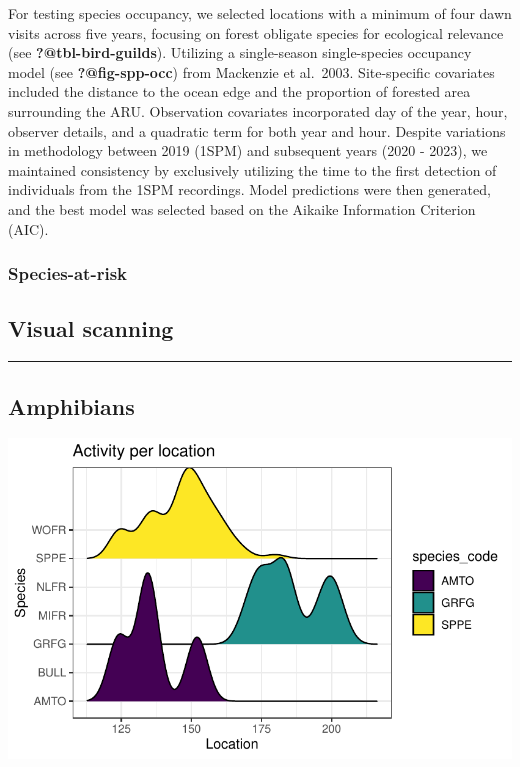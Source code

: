 \documentclass[
  letterpaper,
  DIV=11,
  numbers=noendperiod,
  oneside]{scrartcl}
\begin{document}
For testing species occupancy, we selected locations with a minimum of
four dawn visits across five years, focusing on forest obligate species
for ecological relevance (see \textbf{?@tbl-bird-guilds}). Utilizing a
single-season single-species occupancy model (see
\textbf{?@fig-spp-occ}) from Mackenzie et al.~2003. Site-specific
covariates included the distance to the ocean edge and the proportion of
forested area surrounding the ARU. Observation covariates incorporated
day of the year, hour, observer details, and a quadratic term for both
year and hour. Despite variations in methodology between 2019 (1SPM) and
subsequent years (2020 - 2023), we maintained consistency by exclusively
utilizing the time to the first detection of individuals from the 1SPM
recordings. Model predictions were then generated, and the best model
was selected based on the Aikaike Information Criterion (AIC).

\hypertarget{species-at-risk}{%
\subsubsection{Species-at-risk}\label{species-at-risk}}

\hypertarget{visual-scanning-1}{%
\subsection{Visual scanning}\label{visual-scanning-1}}

\begin{center}\rule{0.5\linewidth}{0.5pt}\end{center}

\hypertarget{amphibians}{%
\subsection{Amphibians}\label{amphibians}}

\includegraphics{peinp_files/figure-pdf/unnamed-chunk-22-1.pdf}
\end{document}
